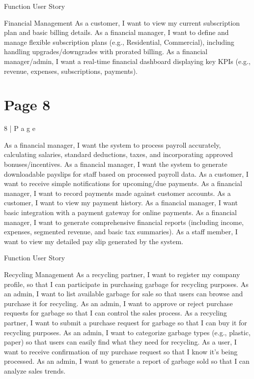 \documentclass{article}
\begin{document}
 
 
  Function  User Story  
 
Financial 
Management 
As a customer, I want to view my current subscription plan and 
basic billing details.  
As a financial manager, I want to define and manage flexible 
subscription plans (e.g., Residential, Commercial), including 
handling upgrades/downgrades with prorated billing.  
As a financial manager/admin, I want a real-time financial 
dashboard displaying key KPIs (e.g., revenue, expenses, 
subscriptions, payments).  

\section*{Page 8}
8 | P a g e 
 
As a financial manager, I want the system to process payroll 
accurately, calculating salaries, standard deductions, taxes, and 
incorporating approved bonuses/incentives.  
As a financial manager, I want the system to generate 
downloadable payslips for staff based on processed payroll data.  
As a customer, I want to receive simple notifications for 
upcoming/due payments.  
As a financial manager, I want to record payments made against 
customer accounts.  
As a customer, I want to view my payment history.  
As a financial manager, I want basic integration with a payment 
gateway for online payments.  
As a financial manager, I want to generate comprehensive financial 
reports (including income, expenses, segmented revenue, and 
basic tax summaries).  
As a staff member, I want to view my detailed pay slip generated by 
the system.  
 
  
 
  Function  User Story  
 
Recycling 
Management 
As a recycling partner, I want to register my company profile, so 
that I can participate in purchasing garbage for recycling purposes.  
As an admin, I want to list available garbage for sale so that users 
can browse and purchase it for recycling.  
As an admin, I want to approve or reject purchase requests for 
garbage so that I can control the sales process.  
As a recycling partner, I want to submit a purchase request for 
garbage so that I can buy it for recycling purposes.  
As an admin, I want to categorize garbage types (e.g., plastic, 
paper) so that users can easily find what they need for recycling.  
As a user, I want to receive confirmation of my purchase request so 
that I know it’s being processed.  
As an admin, I want to generate a report of garbage sold so that I 
can analyze sales trends.  
 
\end{document}
